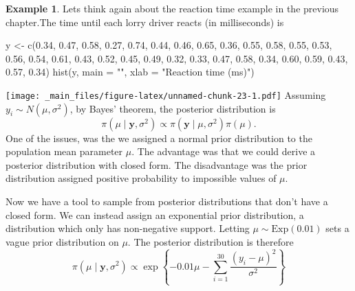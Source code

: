 \documentclass[
]{book}
\newenvironment{Shaded}{\begin{snugshade}}{\end{snugshade}}
\newcommand{\AttributeTok}[1]{\textcolor[rgb]{0.77,0.63,0.00}{#1}}
\newcommand{\FloatTok}[1]{\textcolor[rgb]{0.00,0.00,0.81}{#1}}
\newcommand{\FunctionTok}[1]{\textcolor[rgb]{0.00,0.00,0.00}{#1}}
\newcommand{\NormalTok}[1]{#1}
\newcommand{\OtherTok}[1]{\textcolor[rgb]{0.56,0.35,0.01}{#1}}
\newcommand{\StringTok}[1]{\textcolor[rgb]{0.31,0.60,0.02}{#1}}
\theoremstyle{definition}
\theoremstyle{definition}
\newtheorem{example}{Example}[chapter]
\theoremstyle{definition}
\theoremstyle{definition}
\theoremstyle{remark}
\begin{document}
\begin{example}
\protect\hypertarget{exm:norm}{}\label{exm:norm}Lets think again about the reaction time example in the previous chapter.The time until each lorry driver reacts (in milliseconds) is

\begin{Shaded}
\begin{Highlighting}[]
\NormalTok{y }\OtherTok{\textless{}{-}} \FunctionTok{c}\NormalTok{(}\FloatTok{0.34}\NormalTok{, }\FloatTok{0.47}\NormalTok{, }\FloatTok{0.58}\NormalTok{, }\FloatTok{0.27}\NormalTok{, }\FloatTok{0.74}\NormalTok{, }\FloatTok{0.44}\NormalTok{, }\FloatTok{0.46}\NormalTok{, }\FloatTok{0.65}\NormalTok{, }\FloatTok{0.36}\NormalTok{, }\FloatTok{0.55}\NormalTok{, }\FloatTok{0.58}\NormalTok{, }\FloatTok{0.55}\NormalTok{, }\FloatTok{0.53}\NormalTok{, }\FloatTok{0.56}\NormalTok{, }\FloatTok{0.54}\NormalTok{, }\FloatTok{0.61}\NormalTok{, }\FloatTok{0.43}\NormalTok{, }\FloatTok{0.52}\NormalTok{, }\FloatTok{0.45}\NormalTok{, }\FloatTok{0.49}\NormalTok{, }\FloatTok{0.32}\NormalTok{, }\FloatTok{0.33}\NormalTok{, }\FloatTok{0.47}\NormalTok{, }\FloatTok{0.58}\NormalTok{, }\FloatTok{0.34}\NormalTok{, }\FloatTok{0.60}\NormalTok{, }\FloatTok{0.59}\NormalTok{, }\FloatTok{0.43}\NormalTok{, }\FloatTok{0.57}\NormalTok{, }\FloatTok{0.34}\NormalTok{)}
\FunctionTok{hist}\NormalTok{(y, }\AttributeTok{main =} \StringTok{""}\NormalTok{, }\AttributeTok{xlab =} \StringTok{"Reaction time (ms)"}\NormalTok{)}
\end{Highlighting}
\end{Shaded}

\texttt{[image: \_main\_files/figure-latex/unnamed-chunk-23-1.pdf]}
Assuming \(y_i \sim N(\mu, \sigma^2)\), by Bayes' theorem, the posterior distribution is
\[
\pi(\mu \mid \boldsymbol{y}, \sigma^2) \propto \pi(\boldsymbol{y} \mid \mu, \sigma^2) \pi(\mu).
\]
One of the issues, was the we assigned a normal prior distribution to the population mean parameter \(\mu\). The advantage was that we could derive a posterior distribution with closed form. The disadvantage was the prior distribution assigned positive probability to impossible values of \(\mu\).

Now we have a tool to sample from posterior distributions that don't have a closed form. We can instead assign an exponential prior distribution, a distribution which only has non-negative support. Letting \(\mu \sim \textrm{Exp}(0.01)\) sets a vague prior distribution on \(\mu\). The posterior distribution is therefore
\[
\pi(\mu \mid \boldsymbol{y}, \sigma^2) \propto \exp\left\{-0.01\mu -\sum_{i=1}^{30}\frac{(y_i - \mu)^2}{\sigma^2}\right\} 
\]


\end{example}
\end{document}
